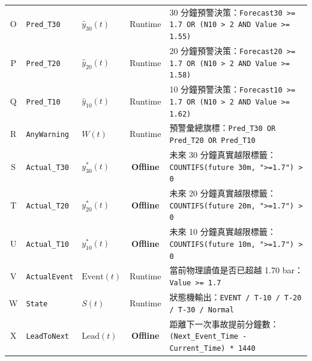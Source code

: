 \documentclass[fontset=none, a4paper, 12pt]{ctexart}
\begin{document}
\begin{doublespace}
\begin{table}[H]
\begin{tabularx}{\textwidth}{cllcX}
O & \texttt{Pred\_T30} & $\hat{y}_{30}(t)$ & Runtime & 30 分鐘預警決策：\texttt{Forecast30 >= 1.7 OR (N10 > 2 AND Value >= 1.55)} \\
P & \texttt{Pred\_T20} & $\hat{y}_{20}(t)$ & Runtime & 20 分鐘預警決策：\texttt{Forecast20 >= 1.7 OR (N10 > 2 AND Value >= 1.58)} \\
Q & \texttt{Pred\_T10} & $\hat{y}_{10}(t)$ & Runtime & 10 分鐘預警決策：\texttt{Forecast10 >= 1.7 OR (N10 > 2 AND Value >= 1.62)} \\
R & \texttt{AnyWarning} & $W(t)$ & Runtime & 預警彙總旗標：\texttt{Pred\_T30 OR Pred\_T20 OR Pred\_T10} \\
S & \texttt{Actual\_T30} & $y_{30}^*(t)$ & \textbf{Offline} & 未來 30 分鐘真實越限標籤：\texttt{COUNTIFS(future 30m, ">=1.7") > 0} \\
T & \texttt{Actual\_T20} & $y_{20}^*(t)$ & \textbf{Offline} & 未來 20 分鐘真實越限標籤：\texttt{COUNTIFS(future 20m, ">=1.7") > 0} \\
U & \texttt{Actual\_T10} & $y_{10}^*(t)$ & \textbf{Offline} & 未來 10 分鐘真實越限標籤：\texttt{COUNTIFS(future 10m, ">=1.7") > 0} \\
V & \texttt{ActualEvent} & $\mathrm{Event}(t)$ & Runtime & 當前物理讀值是否已超越 1.70 bar：\texttt{Value >= 1.7} \\
W & \texttt{State} & $S(t)$ & Runtime & 狀態機輸出：\texttt{EVENT / T-10 / T-20 / T-30 / Normal} \\
X & \texttt{LeadToNext} & $\mathrm{Lead}(t)$ & \textbf{Offline} & 距離下一次事故提前分鐘數：\texttt{(Next\_Event\_Time - Current\_Time) * 1440} \\
\bottomrule
\end{tabularx}
\end{table}


\end{doublespace}
\end{document}
